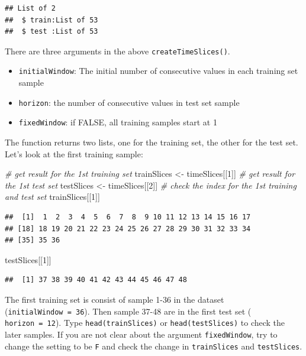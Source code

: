 \documentclass[
  12pt,
]{krantz}
\makeatletter
\newenvironment{Shaded}{\begin{snugshade}}{\end{snugshade}}
\newcommand{\CommentTok}[1]{\textcolor[rgb]{0.37,0.37,0.37}{\textit{#1}}}
\newcommand{\DecValTok}[1]{\textcolor[rgb]{0.06,0.06,0.06}{#1}}
\newcommand{\NormalTok}[1]{#1}
\newcommand{\OtherTok}[1]{\textcolor[rgb]{0.37,0.37,0.37}{#1}}
\providecommand{\tightlist}{%
  \setlength{\itemsep}{0pt}\setlength{\parskip}{0pt}}
\newenvironment{kframe}{%
\medskip{}
\setlength{\fboxsep}{.8em}
 \def\at@end@of@kframe{}%
 \ifinner\ifhmode%
  \def\at@end@of@kframe{\end{minipage}}%
  \begin{minipage}{\columnwidth}%
 \fi\fi%
 \def\FrameCommand##1{\hskip\@totalleftmargin \hskip-\fboxsep
 \colorbox{shadecolor}{##1}\hskip-\fboxsep
     \hskip-\linewidth \hskip-\@totalleftmargin \hskip\columnwidth}%
 \MakeFramed {\advance\hsize-\width
   \@totalleftmargin\z@ \linewidth\hsize
   \@setminipage}}%
 {\par\unskip\endMakeFramed%
 \at@end@of@kframe}
\renewenvironment{Shaded}{\begin{kframe}}{\end{kframe}}
\makeatother
\begin{document}
\begin{verbatim}
## List of 2
##  $ train:List of 53
##  $ test :List of 53
\end{verbatim}

There are three arguments in the above \texttt{createTimeSlices()}.

\begin{itemize}
\tightlist
\item
  \texttt{initialWindow}: The initial number of consecutive values in each training set sample
\item
  \texttt{horizon}: the number of consecutive values in test set sample
\item
  \texttt{fixedWindow}: if FALSE, all training samples start at 1
\end{itemize}

The function returns two lists, one for the training set, the other for the test set. Let's look at the first training sample:

\begin{Shaded}
\begin{Highlighting}[]
\CommentTok{\# get result for the 1st training set}
\NormalTok{trainSlices }\OtherTok{\textless{}{-}}\NormalTok{ timeSlices[[}\DecValTok{1}\NormalTok{]]}
\CommentTok{\# get result for the 1st test set}
\NormalTok{testSlices }\OtherTok{\textless{}{-}}\NormalTok{ timeSlices[[}\DecValTok{2}\NormalTok{]]}
\CommentTok{\# check the index for the 1st training and test set}
\NormalTok{trainSlices[[}\DecValTok{1}\NormalTok{]]}
\end{Highlighting}
\end{Shaded}

\begin{verbatim}
##  [1]  1  2  3  4  5  6  7  8  9 10 11 12 13 14 15 16 17
## [18] 18 19 20 21 22 23 24 25 26 27 28 29 30 31 32 33 34
## [35] 35 36
\end{verbatim}

\begin{Shaded}
\begin{Highlighting}[]
\NormalTok{testSlices[[}\DecValTok{1}\NormalTok{]]}
\end{Highlighting}
\end{Shaded}

\begin{verbatim}
##  [1] 37 38 39 40 41 42 43 44 45 46 47 48
\end{verbatim}

The first training set is consist of sample 1-36 in the dataset (\texttt{initialWindow\ =\ 36}). Then sample 37-48 are in the first test set ( \texttt{horizon\ =\ 12}). Type \texttt{head(trainSlices)} or \texttt{head(testSlices)} to check the later samples. If you are not clear about the argument \texttt{fixedWindow}, try to change the setting to be \texttt{F} and check the change in \texttt{trainSlices} and \texttt{testSlices}.
\end{document}
